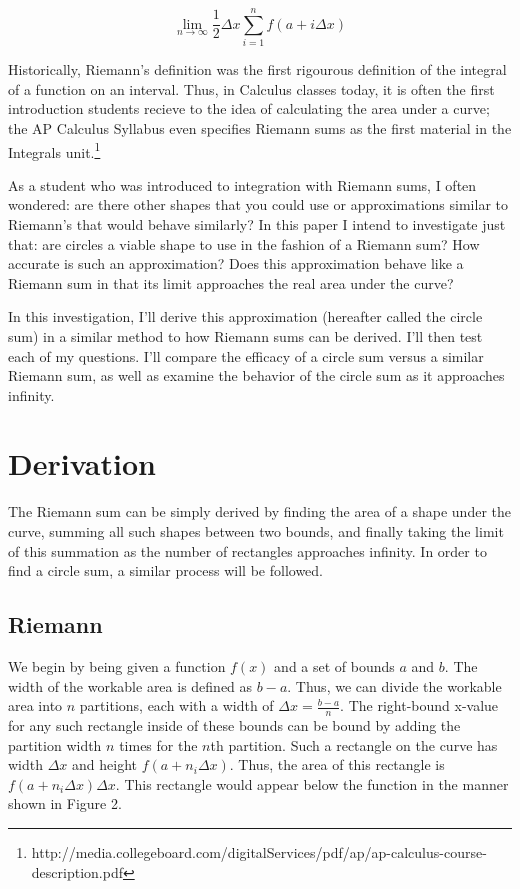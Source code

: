 \documentclass{article}
\begin{document}
    \[ \displaystyle\lim_{n \to \infty}\frac{1}{2}\Delta x\sum_{i=1}^n f(a+i\Delta x) \]

    Historically, Riemann's definition was the first rigourous definition of the integral of a function on an interval. Thus, in Calculus classes today, it is often the first introduction students recieve to the idea of calculating the area under a curve; the AP Calculus Syllabus even specifies Riemann sums as the first material in the Integrals unit.\footnote{http://media.collegeboard.com/digitalServices/pdf/ap/ap-calculus-course-description.pdf}

    As a student who was introduced to integration with Riemann sums, I often wondered: are there other shapes that you could use or approximations similar to Riemann's that would behave similarly? In this paper I intend to investigate just that: are circles a viable shape to use in the fashion of a Riemann sum? How accurate is such an approximation? Does this approximation behave like a Riemann sum in that its limit approaches the real area under the curve?

    In this investigation, I'll derive this approximation (hereafter called the circle sum) in a similar method to how Riemann sums can be derived. I'll then test each of my questions. I'll compare the efficacy of a circle sum versus a similar Riemann sum, as well as examine the behavior of the circle sum as it approaches infinity.

  \section{Derivation}
    The Riemann sum can be simply derived by finding the area of a shape under the curve, summing all such shapes between two bounds, and finally taking the limit of this summation as the number of rectangles approaches infinity. In order to find a circle sum, a similar process will be followed.

    \subsection{Riemann}
      We begin by being given a function \( f(x) \) and a set of bounds \( a \) and \( b \). The width of the workable area is defined as \( b-a \). Thus, we can divide the workable area into \( n \) partitions, each with a width of \( \Delta x = \frac{b-a}{n} \). The right-bound x-value for any such rectangle inside of these bounds can be bound by adding the partition width \( n \) times for the \(n\)th partition. Such a rectangle on the curve has width \( \Delta x \) and height \( f(a+n_i\Delta x) \). Thus, the area of this rectangle is \( f(a+n_i\Delta x)\Delta x \). This rectangle would appear below the function in the manner shown in Figure 2.
\end{document}
